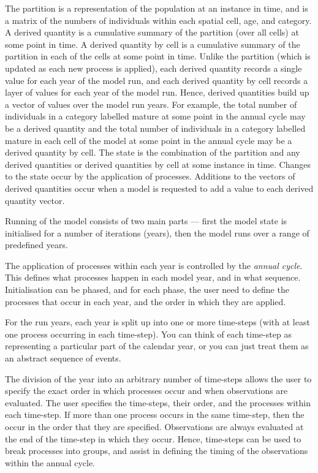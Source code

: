The partition is a representation of the population at an instance in time, and is a matrix of the numbers of individuals within each spatial cell, age, and category. A derived quantity is a cumulative summary of the partition (over all cells) at some point in time. A derived quantity by cell is a cumulative summary of the partition in each of the cells at some point in time. Unlike the partition (which is updated as each new process is applied), each derived quantity records a single value for each year of the model run, and each derived quantity by cell records a layer of values for each year of the model run. Hence, derived quantities build up a vector of values over the model run years. For example, the total number of individuals in a category labelled mature at some point in the annual cycle may be a derived quantity and the total number of individuals in a category labelled mature in each cell of the model at some point in the annual cycle may be a derived quantity by cell. The state is the combination of the partition and any derived quantities or derived quantities by cell at some instance in time. Changes to the state occur by the application of processes. Additions to the vectors of derived quantities occur when a model is requested to add a value to each derived quantity vector. 

Running of the model consists of two main parts --- first the model state is initialised for a number of iterations (years), then the model runs over a range of predefined years. 

The application of processes within each year is controlled by the \emph{annual cycle}. This defines what processes happen in each model year, and in what sequence. Initialisation can be phased, and for each phase, the user need to define the processes that occur in each year, and the order in which they are applied. 

For the run years, each year is split up into one or more time-steps (with at least one process occurring in each time-step). You can think of each time-step as representing a particular part of the calendar year, or you can just treat them as an abstract sequence of events.

The division of the year into an arbitrary number of time-steps allows the user to specify the exact order in which processes occur and when observations are evaluated. The user specifies the time-steps, their order, and the processes within each time-step. If more than one process occurs in the same time-step, then the occur in the order that they are specified. Observations are always evaluated at the end of the time-step in which they occur. Hence, time-steps can be used to break processes into groups, and assist in defining the timing of the observations within the annual cycle. 

